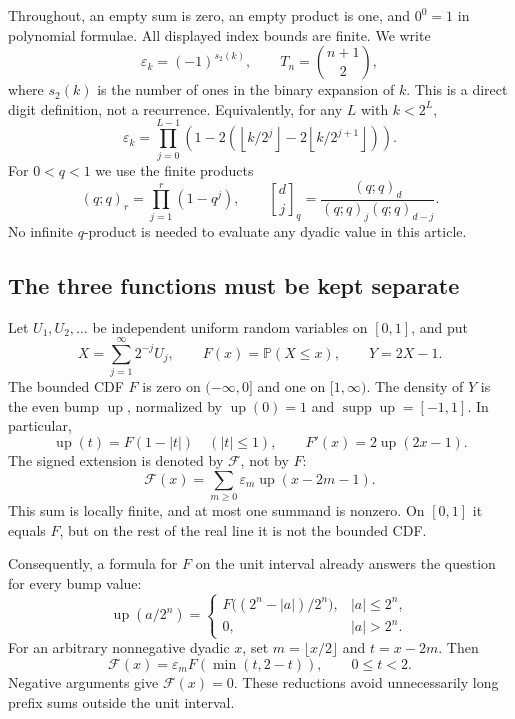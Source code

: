 \documentclass[11pt,oneside]{article}
\theoremstyle{definition}\newtheorem{definition}[theorem]{Definition}
\theoremstyle{remark}\newtheorem{remark}[theorem]{Remark}
\newcommand{\Prob}{\mathbb P}\newcommand{\Up}{\operatorname{up}}
\newcommand{\G}{\mathcal F}\newcommand{\eps}{\varepsilon}
\newcommand{\wt}{s_2}\newcommand{\D}{\mathrm D}
\newcommand{\qbinom}[3]{\genfrac{[}{]}{0pt}{}{#1}{#2}_{#3}}
\DeclareMathOperator{\supp}{supp}
\begin{document}
Throughout, an empty sum is zero, an empty product is one, and $0^0=1$ in
polynomial formulae. All displayed index bounds are finite. We write
\begin{equation}
 \eps_k=(-1)^{\wt(k)},\qquad T_n=\binom{n+1}{2},
 \label{eq:sign}
\end{equation}
where $\wt(k)$ is the number of ones in the binary expansion of $k$.
This is a direct digit definition, not a recurrence. Equivalently, for any
$L$ with $k<2^L$,
\[
 \eps_k=\prod_{j=0}^{L-1}
 \left(1-2\left(\left\lfloor k/2^j\right\rfloor
                  -2\left\lfloor k/2^{j+1}\right\rfloor\right)\right).
\]
For $0<q<1$ we use the finite products
\begin{equation}
 (q;q)_r=\prod_{j=1}^{r}(1-q^j),\qquad
 \qbinom{d}{j}{q}=\frac{(q;q)_d}{(q;q)_j(q;q)_{d-j}}.
 \label{eq:qdef}
\end{equation}
No infinite $q$-product is needed to evaluate any dyadic value in this article.

\subsection{The three functions must be kept separate}
Let $U_1,U_2,\ldots$ be independent uniform random variables on $[0,1]$, and put
\begin{equation}
 X=\sum_{j=1}^{\infty}2^{-j}U_j,
 \qquad F(x)=\Prob(X\le x),\qquad Y=2X-1.
 \label{eq:random}
\end{equation}
The bounded CDF $F$ is zero on $(-\infty,0]$ and one on $[1,\infty)$.
The density of $Y$ is the even bump $\Up$, normalized by $\Up(0)=1$ and
$\supp\Up=[-1,1]$. In particular,
\begin{equation}
 \Up(t)=F(1-|t|)\quad(|t|\le1),
 \qquad F'(x)=2\Up(2x-1).
 \label{eq:dictionary}
\end{equation}
The signed extension is denoted by $\G$, not by $F$:
\begin{equation}
 \G(x)=\sum_{m\ge0}\eps_m\Up(x-2m-1).
 \label{eq:globaldef}
\end{equation}
This sum is locally finite, and at most one summand is nonzero. On $[0,1]$
it equals $F$, but on the rest of the real line it is not the bounded CDF.

Consequently, a formula for $F$ on the unit interval already answers the question
for every bump value:
\begin{equation}
 \boxed{\quad
 \Up(a/2^n)=
 \begin{cases}
 F\bigl((2^n-|a|)/2^n\bigr),& |a|\le2^n,\\
 0,&|a|>2^n.
 \end{cases}\quad}
 \label{eq:upreduction}
\end{equation}
For an arbitrary nonnegative dyadic $x$, set $m=\lfloor x/2\rfloor$ and
$t=x-2m$. Then
\begin{equation}
 \G(x)=\eps_m F(\min(t,2-t)),\qquad 0\le t<2.
 \label{eq:globalreduction}
\end{equation}
Negative arguments give $\G(x)=0$. These reductions avoid unnecessarily long
prefix sums outside the unit interval.
\end{document}
